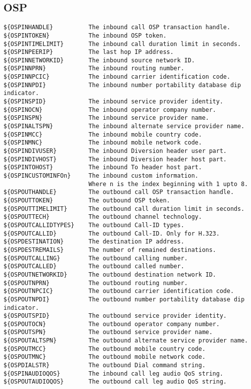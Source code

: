 \subsection{OSP}
\begin{verbatim}
${OSPINHANDLE}          The inbound call OSP transaction handle.
${OSPINTOKEN}           The inbound OSP token.
${OSPINTIMELIMIT}       The inbound call duration limit in seconds.
${OSPINPEERIP}          The last hop IP address.
${OSPINNETWORKID}       The inbound source network ID.
${OSPINNPRN}            The inbound routing number.
${OSPINNPCIC}           The inbound carrier identification code.
${OSPINNPDI}            The inbound number portability database dip indicator.
${OSPINSPID}            The inbound service provider identity.
${OSPINOCN}             The inbound operator company number.
${OSPINSPN}             The inbound service provider name.
${OSPINALTSPN}          The inbound alternate service provider name.
${OSPINMCC}             The inbound mobile country code.
${OSPINMNC}             The inbound mobile network code.
${OSPINDIVUSER}         The inbound Diversion header user part.
${OSPINDIVHOST}         The inbound Diversion header host part.
${OSPINTOHOST}          The inbound To header host part.
${OSPINCUSTOMINFOn}     The inbound custom information.
                        Where n is the index beginning with 1 upto 8.
${OSPOUTHANDLE}         The outbound call OSP transaction handle.
${OSPOUTTOKEN}          The outbound OSP token.
${OSPOUTTIMELIMIT}      The outbound call duration limit in seconds.
${OSPOUTTECH}           The outbound channel technology.
${OSPOUTCALLIDTYPES}    The outbound Call-ID types.
${OSPOUTCALLID}         The outbound Call-ID. Only for H.323.
${OSPDESTINATION}       The destination IP address.
${OSPDESTREMAILS}       The number of remained destinations.
${OSPOUTCALLING}        The outbound calling number.
${OSPOUTCALLED}         The outbound called number.
${OSPOUTNETWORKID}      The outbound destination network ID.
${OSPOUTNPRN}           The outbound routing number.
${OSPOUTNPCIC}          The outbound carrier identification code.
${OSPOUTNPDI}           The outbound number portability database dip indicator.
${OSPOUTSPID}           The outbound service provider identity.
${OSPOUTOCN}            The outbound operator company number.
${OSPOUTSPN}            The outbound service provider name.
${OSPOUTALTSPN}         The outbound alternate service provider name.
${OSPOUTMCC}            The outbound mobile country code.
${OSPOUTMNC}            The outbound mobile network code.
${OSPDIALSTR}           The outbound Dial command string.
${OSPINAUDIOQOS}        The inbound call leg audio QoS string.
${OSPOUTAUDIOQOS}       The outbound call leg audio QoS string.
\end{verbatim}

